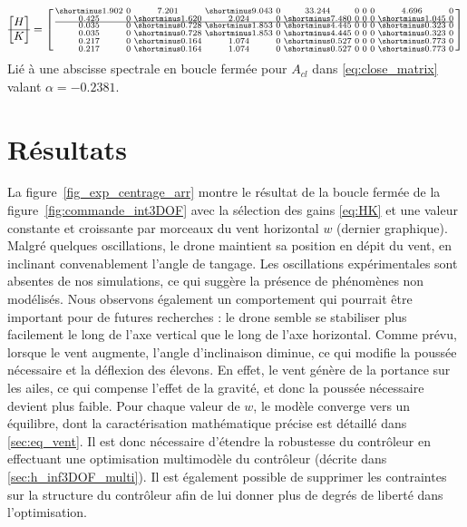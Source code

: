 \begin{align}\label{eq:HK}
\begin{bmatrix}
H\\ \hline K 
\end{bmatrix} = \smallmat{
\shortminus1.902 & 0 & 7.201 & \shortminus9.043  & 0 & 33.244 & 0 & 0 & 0 & 4.696  & 0 \\ 
0.425 & 0 & \shortminus1.620 & 2.024  & 0 & \shortminus7.480 & 0 & 0 & 0 & \shortminus1.045  & 0 \\  \hline
0.035 & 0 & \shortminus0.728 & \shortminus1.853  & 0 & \shortminus4.445 & 0 & 0 & 0 & \shortminus0.323  & 0 \\ 
0.035 & 0 & \shortminus0.728 & \shortminus1.853  & 0 & \shortminus4.445 & 0 & 0 & 0 & \shortminus0.323  & 0 \\ 
0.217  & 0 & \shortminus0.164  & 1.074 & 0 & \shortminus0.527 & 0 & 0 & 0 & \shortminus0.773 & 0 \\ 
0.217  & 0 & \shortminus0.164  & 1.074 & 0 & \shortminus0.527 & 0 & 0 & 0 & \shortminus0.773 & 0  
}
\end{align}
Lié à une abscisse spectrale en boucle fermée pour $A_{cl}$ dans \eqref{eq:close_matrix} valant  $\alpha = -0.2381$.



\section{Résultats}
\label{sec:exp3DOF}
La figure~\ref{fig_exp_centrage_arr} montre le résultat de la boucle fermée de la figure~\ref{fig:commande_int3DOF} avec la sélection des gains \eqref{eq:HK} et une valeur constante et croissante par morceaux du vent horizontal $w$ (dernier graphique). 
Malgré quelques oscillations, le drone maintient sa position en dépit du vent, en inclinant convenablement l'angle de tangage. Les oscillations expérimentales sont absentes de nos simulations, ce qui suggère la présence de phénomènes non modélisés.
Nous observons également un comportement qui pourrait être important pour de futures recherches : le drone semble se stabiliser plus facilement le long de l'axe vertical que le long de l'axe horizontal. Comme prévu, lorsque le vent augmente, l'angle d'inclinaison diminue, ce qui modifie la poussée nécessaire et la déflexion des élevons. En effet, le vent génère de la portance sur les ailes, ce qui compense l'effet de la gravité, et donc la poussée nécessaire devient plus faible.
Pour chaque valeur de $w$, le modèle converge vers un équilibre, dont la caractérisation mathématique précise est détaillé dans \ref{sec:eq_vent}. Il est donc nécessaire d'étendre la robustesse du contrôleur en effectuant une optimisation multimodèle du contrôleur (décrite dans \ref{sec:h_inf3DOF_multi}). Il est également possible de supprimer les contraintes sur la structure du contrôleur afin de lui donner plus de degrés de liberté dans l'optimisation.


